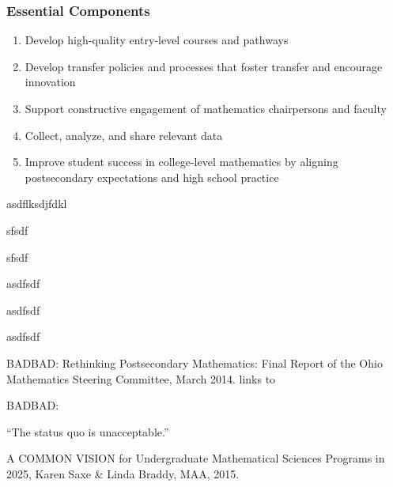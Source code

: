 \documentclass[13pt]{beamer}
\newcounter{a}
\newcounter{b}
\begin{document}
\begin{frame}
  \frametitle{Essential Components}

  \begin{enumerate}
    \item Develop high-quality entry-level courses and pathways
    \item Develop transfer policies and processes that foster transfer and encourage innovation
    \item Support constructive engagement of mathematics chairpersons and faculty
    \item Collect, analyze, and share relevant data
    \item Improve student success in college-level mathematics by aligning postsecondary expectations and high school practice
  \end{enumerate}

  asdflksdjfdkl

  sfsdf

  sfsdf

  asdfsdf

  asdfsdf

  asdfsdf
  
BADBAD: Rethinking Postsecondary Mathematics:  Final Report of the Ohio Mathematics Steering Committee, March 2014. links to %
\end{frame}

\begin{frame}
  BADBAD:
  
  ``The status quo is unacceptable.''

  A COMMON VISION for Undergraduate Mathematical Sciences Programs in 2025, Karen Saxe \& Linda Braddy, MAA, 2015.
\end{frame}
\end{document}
